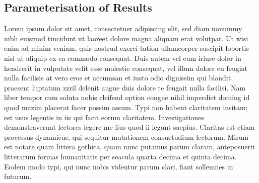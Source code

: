 \documentclass[final,3p,times,twocolumn]{elsarticle}
\begin{document}



\subsection{Parameterisation of Results}
Lorem ipsum dolor sit amet, consectetuer adipiscing elit, sed diam nonummy nibh euismod tincidunt ut laoreet dolore magna aliquam erat volutpat. Ut wisi enim ad minim veniam, quis
nostrud exerci tation ullamcorper suscipit lobortis nisl ut aliquip ex ea commodo consequat. Duis autem vel eum iriure dolor in hendrerit in vulputate velit esse molestie consequat,
vel illum dolore eu feugiat nulla facilisis at vero eros et accumsan et iusto odio dignissim qui blandit praesent luptatum zzril delenit augue duis dolore te feugait nulla facilisi.
Nam liber tempor cum soluta nobis eleifend option congue nihil imperdiet doming id quod mazim placerat facer possim assum. Typi non habent claritatem insitam; est usus legentis in
iis qui facit eorum claritatem. Investigationes demonstraverunt lectores legere me lius quod ii legunt saepius. Claritas est etiam processus dynamicus, qui sequitur mutationem
consuetudium lectorum. Mirum est notare quam littera gothica, quam nunc putamus parum claram, anteposuerit litterarum formas humanitatis per seacula quarta decima et quinta
decima. Eodem modo typi, qui nunc nobis videntur parum clari, fiant sollemnes in futurum.

\end{document}
